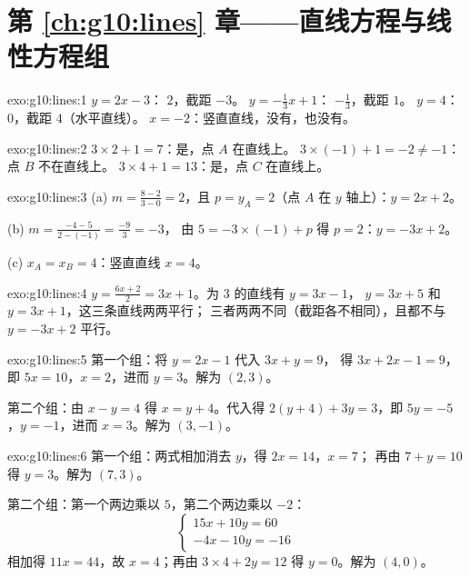 \section*{第 \ref{ch:g10:lines} 章——直线方程与线性方程组}

\begin{solution}{exo:g10:lines:1}
$y = 2x - 3$： $2$，截距 $-3$。
$y = -\frac13 x + 1$： $-\frac13$，截距 $1$。
$y = 4$： $0$，截距 $4$（水平直线）。
$x = -2$：竖直直线，没有，也没有。
\end{solution}

\begin{solution}{exo:g10:lines:2}
$3 \times 2 + 1 = 7$：是，点 $A$ 在直线上。
$3 \times (-1) + 1 = -2 \neq -1$：点 $B$ 不在直线上。
$3 \times 4 + 1 = 13$：是，点 $C$ 在直线上。
\end{solution}

\begin{solution}{exo:g10:lines:3}
(a) $m = \frac{8 - 2}{3 - 0} = 2$，且 $p = y_A = 2$（点 $A$ 在
$y$ 轴上）：$y = 2x + 2$。

(b) $m = \frac{-4 - 5}{2 - (-1)} = \frac{-9}{3} = -3$，
由 $5 = -3 \times (-1) + p$ 得 $p = 2$：$y = -3x + 2$。

(c) $x_A = x_B = 4$：竖直直线 $x = 4$。
\end{solution}

\begin{solution}{exo:g10:lines:4}
$y = \frac{6x+2}{2} = 3x + 1$。为 $3$ 的直线有 $y = 3x - 1$，
$y = 3x + 5$ 和 $y = 3x + 1$，这三条直线两两平行；
三者两两不同（截距各不相同），且都不与
$y = -3x + 2$ 平行。
\end{solution}

\begin{solution}{exo:g10:lines:5}
第一个组：将 $y = 2x - 1$ 代入 $3x + y = 9$，
得 $3x + 2x - 1 = 9$，即 $5x = 10$，$x = 2$，进而 $y = 3$。解为
$(2, 3)$。

第二个组：由 $x - y = 4$ 得 $x = y + 4$。代入得
$2(y + 4) + 3y = 3$，即 $5y = -5$，$y = -1$，进而 $x = 3$。解为
$(3, -1)$。
\end{solution}

\begin{solution}{exo:g10:lines:6}
第一个组：两式相加消去 $y$，得 $2x = 14$，$x = 7$；
再由 $7 + y = 10$ 得 $y = 3$。解为 $(7, 3)$。

第二个组：第一个两边乘以 $5$，第二个两边乘以 $-2$：
\[
\begin{cases}
15x + 10y = 60 \\
-4x - 10y = -16
\end{cases}
\]
相加得 $11x = 44$，故 $x = 4$；再由 $3 \times 4 + 2y = 12$ 得
$y = 0$。解为 $(4, 0)$。
\end{solution}

